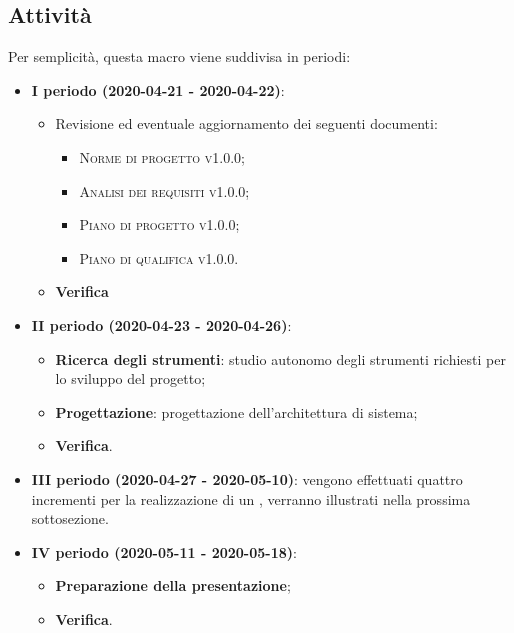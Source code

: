 \documentclass[../piano-di-progetto.tex]{subfiles}
\begin{document}
\subsection{Attività}   
Per semplicità, questa macro viene suddivisa in periodi:
\begin{itemize}

    \item \textbf{I periodo (2020-04-21 - 2020-04-22)}: \\
        \begin{itemize}
            \item Revisione ed eventuale aggiornamento dei seguenti documenti:
            \begin{itemize}
                \item \textsc{Norme di progetto v1.0.0};
                \item \textsc{Analisi dei requisiti v1.0.0};
                \item \textsc{Piano di progetto v1.0.0};
                \item \textsc{Piano di qualifica v1.0.0}.
            \end{itemize}

            \item \textbf{Verifica}
        \end{itemize}

    \item \textbf{II periodo (2020-04-23 - 2020-04-26)}:
        \begin{itemize}
            \item \textbf{Ricerca degli strumenti}: studio autonomo degli strumenti richiesti per lo sviluppo del progetto; 
            \item \textbf{Progettazione}: progettazione dell'architettura di sistema;
            \item \textbf{Verifica}.
        \end{itemize}
    \item \textbf{III periodo (2020-04-27 - 2020-05-10)}: vengono effettuati quattro incrementi per la realizzazione di un , verranno illustrati nella prossima sottosezione.
    \item \textbf{IV periodo (2020-05-11 - 2020-05-18)}: 
            \begin{itemize}
                \item \textbf{Preparazione della presentazione};
                \item \textbf{Verifica}.
            \end{itemize}
        \end{itemize}
\end{document}
